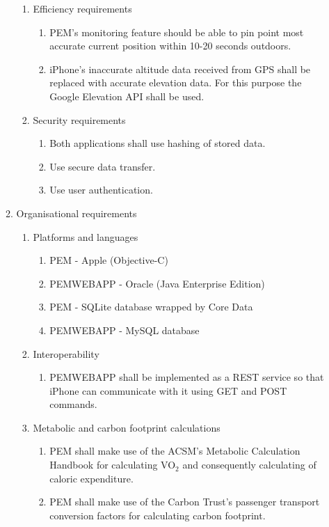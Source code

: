 \documentclass[12pt, a4paper]{report}   %
\begin{document}
\begin{enumerate}
\begin{enumerate}
\begin{enumerate}
		\item Efficiency requirements
		\begin{enumerate}
			\item PEM's monitoring feature should be able to pin point most accurate current position within 10-20 seconds outdoors.\\
			\item iPhone's inaccurate altitude data received from GPS shall be replaced with accurate elevation data. For this purpose the Google Elevation API shall be used.\\
		\end{enumerate}

		\item Security requirements
		\begin{enumerate}
			\item Both applications shall use hashing of stored data.
			\item Use secure data transfer.
			\item Use user authentication.\\
		\end{enumerate}
	\end{enumerate}

	\item Organisational requirements

		\begin{enumerate}
			\item Platforms and languages
			\begin{enumerate}
				\item PEM - Apple (Objective-C)
				\item PEMWEBAPP - Oracle (Java Enterprise Edition)
				\item PEM - SQLite database wrapped by Core Data
				\item PEMWEBAPP - MySQL database\\
			\end{enumerate}
			
			\item Interoperability
			\begin{enumerate}
				\item PEMWEBAPP shall be implemented as a REST service so that iPhone can communicate with it using GET and POST commands.\\
			\end{enumerate}

			\item Metabolic and carbon footprint calculations
			\begin{enumerate}
				\item PEM shall make use of the ACSM's Metabolic Calculation Handbook for calculating VO$_{2}$ and consequently calculating of caloric expenditure.
				\item PEM shall make use of the Carbon Trust's passenger transport conversion factors for calculating carbon footprint.\\
			\end{enumerate}
		\end{enumerate}
		

\end{enumerate}
\end{enumerate}
\end{document}
